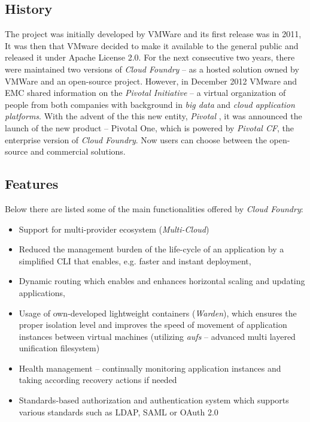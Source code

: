 \subsection{History}
The project was initially developed by VMWare and its first release was in 2011, It was then that VMware decided to make it available to the general public and released it under Apache License 2.0. For the next consecutive two years, there were maintained two versions of \emph{Cloud Foundry} -- as a hosted solution owned by VMWare and an open-source project. However, in December 2012 VMware and EMC shared information on the \emph{Pivotal Initiative} \cite{PivotalInitiative} -- a virtual organization of people from both companies with background in \emph{big data} and \emph{cloud application platforms}. With the advent of the this new entity, \emph{Pivotal} \cite{GoPivotal}, it was announced the launch of the new product -- Pivotal One, which is powered by \emph{Pivotal CF}, the enterprise version of \emph{Cloud Foundry}. Now users can choose between the open-source and commercial solutions.

\subsection{Features}
Below there are listed some of the main functionalities offered by \emph{Cloud Foundry}:
\begin{itemize}
  \item Support for multi-provider ecosystem (\emph{Multi-Cloud})
  \item Reduced the management burden of the life-cycle of an application by a simplified CLI that enables, e.g. faster and instant deployment,
  \item Dynamic routing which enables and enhances horizontal scaling and updating applications,
  \item Usage of own-developed lightweight containers (\emph{Warden}), which ensures the proper isolation level and improves the speed of movement of application instances between virtual machines (utilizing \emph{aufs} -- advanced multi layered unification filesystem)
  \item Health management -- continually monitoring application instances and taking according recovery actions if needed
  \item Standards-based authorization and authentication system which supports various standards such as LDAP, SAML or OAuth 2.0
\end{itemize}

